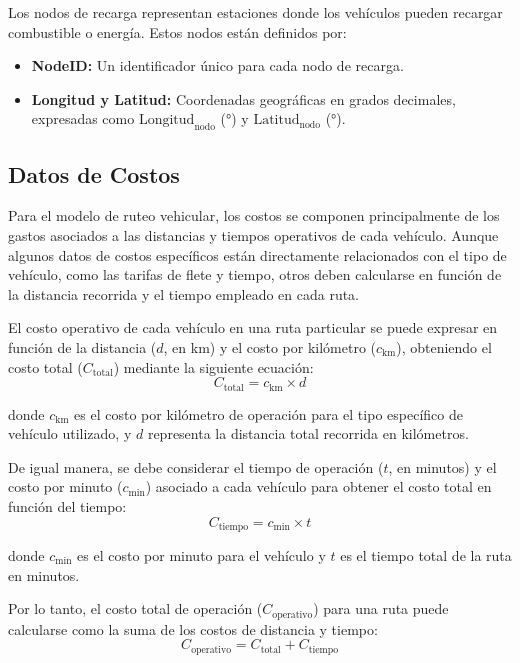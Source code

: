 \documentclass[12pt]{article}
\begin{document}
Los nodos de recarga representan estaciones donde los vehículos pueden recargar combustible o energía. Estos nodos están definidos por:
\begin{itemize}
    \item \textbf{NodeID:} Un identificador único para cada nodo de recarga.
    \item \textbf{Longitud y Latitud:} Coordenadas geográficas en grados decimales, expresadas como $\text{Longitud}_{\text{nodo}}$ (°) y $\text{Latitud}_{\text{nodo}}$ (°).
\end{itemize}

\subsection{Datos de Costos}

Para el modelo de ruteo vehicular, los costos se componen principalmente de los gastos asociados a las distancias y tiempos operativos de cada vehículo. Aunque algunos datos de costos específicos están directamente relacionados con el tipo de vehículo, como las tarifas de flete y tiempo, otros deben calcularse en función de la distancia recorrida y el tiempo empleado en cada ruta.

El costo operativo de cada vehículo en una ruta particular se puede expresar en función de la distancia ($d$, en km) y el costo por kilómetro ($c_{\text{km}}$), obteniendo el costo total ($C_{\text{total}}$) mediante la siguiente ecuación:
\begin{equation}
C_{\text{total}} = c_{\text{km}} \times d
\end{equation}

donde $c_{\text{km}}$ es el costo por kilómetro de operación para el tipo específico de vehículo utilizado, y $d$ representa la distancia total recorrida en kilómetros.

De igual manera, se debe considerar el tiempo de operación ($t$, en minutos) y el costo por minuto ($c_{\text{min}}$) asociado a cada vehículo para obtener el costo total en función del tiempo:
\begin{equation}
C_{\text{tiempo}} = c_{\text{min}} \times t
\end{equation}

donde $c_{\text{min}}$ es el costo por minuto para el vehículo y $t$ es el tiempo total de la ruta en minutos.

Por lo tanto, el costo total de operación ($C_{\text{operativo}}$) para una ruta puede calcularse como la suma de los costos de distancia y tiempo:
\begin{equation}
C_{\text{operativo}} = C_{\text{total}} + C_{\text{tiempo}}
\end{equation}
\end{document}
